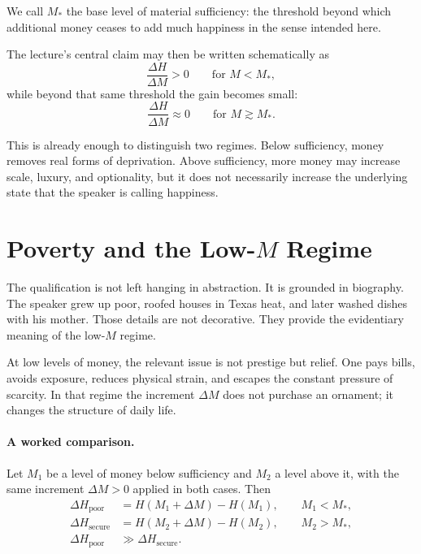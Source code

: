 \begin{definition}
We call \(M_*\) the base level of material sufficiency: the threshold beyond which additional money ceases to add much happiness in the sense intended here.
\end{definition}

The lecture’s central claim may then be written schematically as
\begin{equation}
\frac{\Delta H}{\Delta M}>0
\qquad
\text{for } M<M_*,
\end{equation}
while beyond that same threshold the gain becomes small:
\begin{equation}
\frac{\Delta H}{\Delta M}\approx 0
\qquad
\text{for } M\gtrsim M_*.
\end{equation}

This is already enough to distinguish two regimes. Below sufficiency, money removes real forms of deprivation. Above sufficiency, more money may increase scale, luxury, and optionality, but it does not necessarily increase the underlying state that the speaker is calling happiness.

\section{Poverty and the Low-\(M\) Regime}

The qualification is not left hanging in abstraction. It is grounded in biography. The speaker grew up poor, roofed houses in Texas heat, and later washed dishes with his mother. Those details are not decorative. They provide the evidentiary meaning of the low-\(M\) regime.

At low levels of money, the relevant issue is not prestige but relief. One pays bills, avoids exposure, reduces physical strain, and escapes the constant pressure of scarcity. In that regime the increment \(\Delta M\) does not purchase an ornament; it changes the structure of daily life.

\paragraph{A worked comparison.}
Let \(M_1\) be a level of money below sufficiency and \(M_2\) a level above it, with the same increment \(\Delta M>0\) applied in both cases. Then
\begin{align}
\Delta H_{\text{poor}} &= H(M_1+\Delta M)-H(M_1), \qquad M_1<M_*,\\
\Delta H_{\text{secure}} &= H(M_2+\Delta M)-H(M_2), \qquad M_2>M_*,\\
\Delta H_{\text{poor}} &\gg \Delta H_{\text{secure}}.
\end{align}

